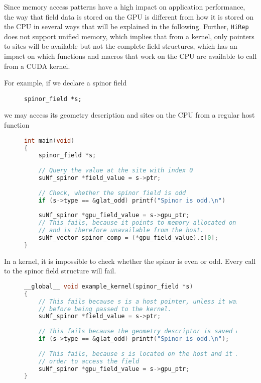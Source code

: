 \documentclass[12pt]{article}
\begin{document}
Since memory access patterns have a high impact on application performance, the way that field data is stored on the GPU is different from how it is stored on the CPU in several ways that will be explained in the following. Further, \texttt{HiRep} does not support unified memory, which implies that from a kernel, only pointers to sites will be available but not the complete field structures, which has an impact on which functions and macros that work on the CPU are available to call from a CUDA kernel. \par

For example, if we declare a spinor field 

\begin{figure}[H]
\begin{lstlisting}[caption=Declare spinor field]
spinor_field *s;
\end{lstlisting}
\end{figure}

we may access its geometry description and sites on the CPU from a regular host function
\begin{figure}[H]
\begin{lstlisting}[caption=Example for host function,language=C]
int main(void) 
{
    spinor_field *s;
    
    // Query the value at the site with index 0
    suNf_spinor *field_value = s->ptr;
    
    // Check, whether the spinor field is odd
    if (s->type == &glat_odd) printf("Spinor is odd.\n")
    
    suNf_spinor *gpu_field_value = s->gpu_ptr;
    // This fails, because it points to memory allocated on the GPU
    // and is therefore unavailable from the host.
    suNf_vector spinor_comp = (*gpu_field_value).c[0];
}
\end{lstlisting}
\end{figure}

In a kernel, it is impossible to check whether the spinor is even or odd. Every call to the spinor field structure will fail.

\begin{figure}[H]
\begin{lstlisting}[caption=Example for kernel,language=C]
__global__ void example_kernel(spinor_field *s) 
{
    // This fails because s is a host pointer, unless it was transferred
    // before being passed to the kernel.
    suNf_spinor *field_value = s->ptr;
    
    // This fails because the geometry descriptor is saved on the host
    if (s->type == &glat_odd) printf("Spinor is odd.\n");
    
    // This fails, because s is located on the host and it is accessed in
    // order to access the field
    suNf_spinor *gpu_field_value = s->gpu_ptr;
}
\end{lstlisting}
\end{figure}
\end{document}
